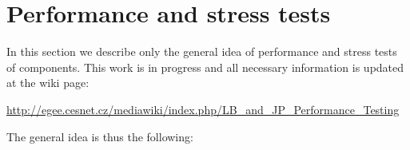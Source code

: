 %
%
%
%
\section{Performance and stress tests}
\label{s:perftests}

In this section we describe only the general idea of performance and stress tests of \LB components.
This work is in progress and all necessary information is updated at the wiki page:

\begin{center}
\url{http://egee.cesnet.cz/mediawiki/index.php/LB_and_JP_Performance_Testing}
\end{center}

The general idea is thus the following:

